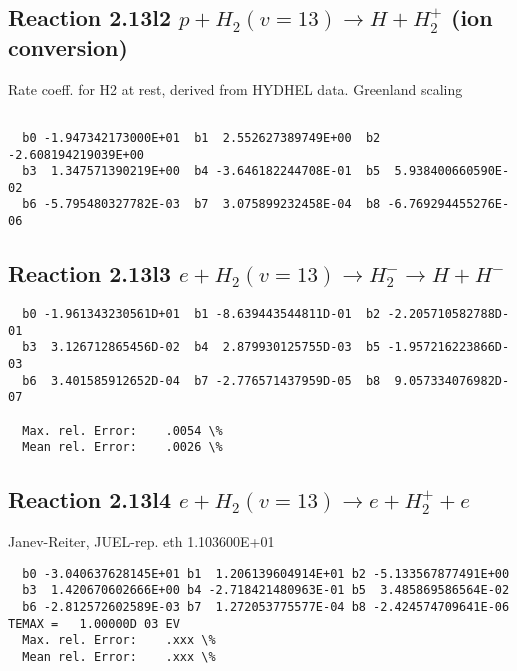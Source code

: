 \documentclass[12pt,dvipdfmx]{article}
\begin{document}
\subsection{
Reaction 2.13l2
$ p + H_2(v=13) \rightarrow H + H_2^+$ (ion conversion)
}
Rate coeff. for H2 at rest, derived from HYDHEL data. Greenland scaling


\begin{small}\begin{verbatim}

  b0 -1.947342173000E+01  b1  2.552627389749E+00  b2 -2.608194219039E+00
  b3  1.347571390219E+00  b4 -3.646182244708E-01  b5  5.938400660590E-02
  b6 -5.795480327782E-03  b7  3.075899232458E-04  b8 -6.769294455276E-06

\end{verbatim}\end{small}

\newpage

\subsection{
Reaction 2.13l3
 $ e + H_2(v=13) \rightarrow H_2^- \rightarrow H + H^-$
}


\begin{small}\begin{verbatim}
  b0 -1.961343230561D+01  b1 -8.639443544811D-01  b2 -2.205710582788D-01
  b3  3.126712865456D-02  b4  2.879930125755D-03  b5 -1.957216223866D-03
  b6  3.401585912652D-04  b7 -2.776571437959D-05  b8  9.057334076982D-07

  Max. rel. Error:    .0054 \%
  Mean rel. Error:    .0026 \%
\end{verbatim}\end{small}

\subsection{
Reaction 2.13l4
 $ e + H_2(v=13) \rightarrow e + H_2^+  + e$
}
Janev-Reiter, JUEL-rep. eth 1.103600E+01

\begin{small}\begin{verbatim}
  b0 -3.040637628145E+01 b1  1.206139604914E+01 b2 -5.133567877491E+00
  b3  1.420670602666E+00 b4 -2.718421480963E-01 b5  3.485869586564E-02
  b6 -2.812572602589E-03 b7  1.272053775577E-04 b8 -2.424574709641E-06
TEMAX =   1.00000D 03 EV
  Max. rel. Error:    .xxx \%
  Mean rel. Error:    .xxx \%
\end{verbatim}\end{small}
\end{document}
